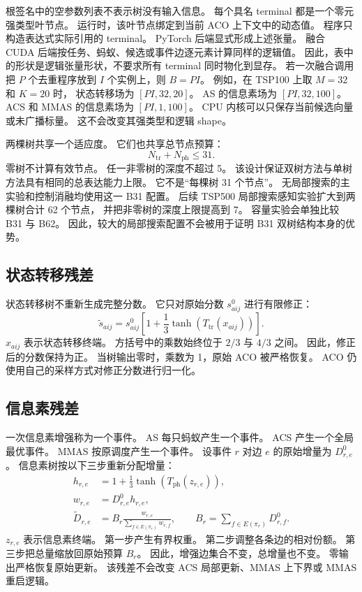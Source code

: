 \documentclass[letterpaper,journal]{IEEEtran}
\begin{document}
根签名中的空参数列表不表示树没有输入信息。
每个具名 terminal 都是一个零元强类型叶节点。
运行时，该叶节点绑定到当前 ACO 上下文中的动态值。
程序只构造表达式实际引用的 terminal。
PyTorch 后端显式形成上述张量。
融合 CUDA 后端按任务、蚂蚁、候选或事件边逐元素计算同样的逻辑值。
因此，表中的形状是逻辑张量形状，不要求所有 terminal 同时物化到显存。
若一次融合调用把 \(P\) 个去重程序放到 \(I\) 个实例上，则
\(B=P I\)。
例如，在 TSP100 上取 \(M=32\) 和 \(K=20\) 时，
状态转移场为 \([PI,32,20]\)。
AS 的信息素场为 \([PI,32,100]\)。
ACS 和 MMAS 的信息素场为 \([PI,1,100]\)。
CPU 内核可以只保存当前候选向量或未广播标量。
这不会改变其强类型和逻辑 shape。

两棵树共享一个适应度。
它们也共享总节点预算：
\begin{equation}
 N_{\mathrm{tr}}+N_{\mathrm{ph}}\leq31 .
 \label{eq:node-budget-zh}
\end{equation}
零树不计算有效节点。
任一非零树的深度不超过 5。
该设计保证双树方法与单树方法具有相同的总表达能力上限。
它不是“每棵树 31 个节点”。
无局部搜索的主实验和控制消融均使用这一 B31 配置。
后续 TSP500 局部搜索感知实验扩大到两棵树合计 62 个节点，
并把非零树的深度上限提高到 7。
容量实验会单独比较 B31 与 B62。
因此，较大的局部搜索配置不会被用于证明 B31 双树结构本身的优势。

\subsection{状态转移残差}

状态转移树不重新生成完整分数。
它只对原始分数 \(s^0_{aij}\) 进行有限修正：
\begin{equation}
 \widetilde{s}_{aij}
 =s^0_{aij}
 \left[1+\frac{1}{3}\tanh\!\left(T_{\mathrm{tr}}(x_{aij})\right)\right].
 \label{eq:transition-residual-zh}
\end{equation}
\(x_{aij}\) 表示状态转移终端。
方括号中的乘数始终位于 \(2/3\) 与 \(4/3\) 之间。
因此，修正后的分数保持为正。
当树输出零时，乘数为 1，原始 ACO 被严格恢复。
ACO 仍使用自己的采样方式对修正分数进行归一化。

\subsection{信息素残差}

一次信息素增强称为一个事件。
AS 每只蚂蚁产生一个事件。
ACS 产生一个全局最优事件。
MMAS 按原调度产生一个事件。
设事件 \(r\) 对边 \(e\) 的原始增量为 \(D^0_{r,e}\)。
信息素树按以下三步重新分配增量：
\begin{equation}
\begin{aligned}
 h_{r,e}&=1+\frac{1}{3}\tanh\!\left(T_{\mathrm{ph}}(z_{r,e})\right),\\
 w_{r,e}&=D^0_{r,e}h_{r,e},\\
 \widetilde D_{r,e}
 &=B_r\frac{w_{r,e}}{\sum_{f\in E(\pi_r)}w_{r,f}},
 \qquad B_r=\sum_{f\in E(\pi_r)}D^0_{r,f}.
\end{aligned}
\label{eq:pheromone-residual-zh}
\end{equation}
\(z_{r,e}\) 表示信息素终端。
第一步产生有界权重。
第二步调整各条边的相对份额。
第三步把总量缩放回原始预算 \(B_r\)。
因此，增强边集合不变，总增量也不变。
零输出严格恢复原始更新。
该残差不会改变 ACS 局部更新、MMAS 上下界或 MMAS 重启逻辑。
\end{document}
